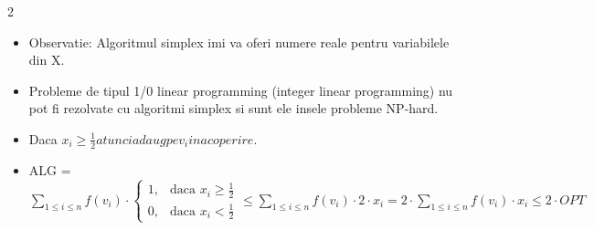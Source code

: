 \documentclass[a4paper]{article}
\begin{document}
\begin{multicols}{2}
\begin{itemize}
\begin{itemize}
    \item $0 \leq x_i \leq 1, \forall i \in {1,...,n}$
    \end{itemize}
    \item Observatie: Algoritmul simplex imi va oferi numere reale pentru variabilele din X. 
    \item Probleme de tipul 1/0 linear programming (integer linear programming) nu pot fi rezolvate cu algoritmi simplex si sunt ele insele probleme NP-hard.
    \item Daca $x_i \geq \frac{1}{2} atunci adaug pe v_i in acoperire$.
    \item ALG = $\sum\limits_{1 \leq i \leq n} f(v_i) \cdot \begin{cases}
        1, & \text{daca }  x_i \geq \frac{1}{2} \\
        0, & \text{daca }  x_i < \frac{1}{2}
    \end{cases} \leq \sum\limits_{1 \leq i \leq n} f(v_i) \cdot 2\cdot x_i = 2 \cdot \sum\limits_{1 \leq i \leq n} f(v_i) \cdot x_i \leq 2 \cdot OPT$
\end{itemize}

\end{multicols}

\section{}
\end{document}

